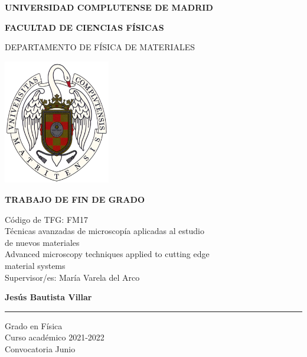 
\begin{titlepage}
\centering
{ \bfseries \Large UNIVERSIDAD COMPLUTENSE DE MADRID}
\vspace{0.5cm}

{\bfseries  \Large FACULTAD DE CIENCIAS FÍSICAS} 
\vspace{1cm}

{\large DEPARTAMENTO DE FÍSICA DE MATERIALES}
\vspace{0.8cm}

{\includegraphics[width=0.35\textwidth]{fig/logo_UCM.png}}
\vspace{0.8cm}

{\bfseries \Large TRABAJO DE FIN DE GRADO}

\vfill
{\Large Código de TFG:  FM17 } \vspace{5mm} \\
{\Large Técnicas avanzadas de microscopía aplicadas al estudio \\ de nuevos materiales}\vspace{5mm} \\
{\Large Advanced microscopy techniques applied to cutting edge \\ material systems}\vspace{5mm} \\
{\Large Supervisor/es: María Varela del Arco}\\ 
\vfill

{\bfseries \LARGE Jesús Bautista Villar} \\
\noindent\rule{8cm}{0.4pt}\vspace{5mm}

{\large Grado en Física}\vspace{2.5mm} \\
{\large Curso acad\'emico 2021-2022}\vspace{2.5mm} \\
{\large Convocatoria Junio} \\ 

\end{titlepage}

